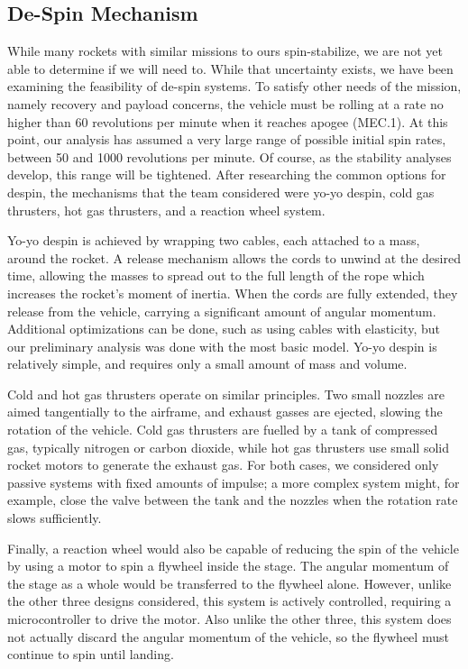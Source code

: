 \subsection{De-Spin Mechanism}
While many rockets with similar missions to ours spin-stabilize, we are not yet able to determine if we will need to. While that uncertainty exists, we have been examining the feasibility of de-spin systems. To satisfy other needs of the mission, namely recovery and payload concerns, the vehicle must be rolling at a rate no higher than 60 revolutions per minute when it reaches apogee (MEC.1). At this point, our analysis has assumed a very large range of possible initial spin rates, between 50 and 1000 revolutions per minute. Of course, as the stability analyses develop, this range will be tightened. After researching the common options for despin, the mechanisms that the team considered were yo-yo despin, cold gas thrusters, hot gas thrusters, and a reaction wheel system.

Yo-yo despin is achieved by wrapping two cables, each attached to a mass, around the rocket. A release mechanism allows the cords to unwind at the desired time, allowing the masses to spread out to the full length of the rope which increases the rocket’s moment of inertia. When the cords are fully extended, they release from the vehicle, carrying a significant amount of angular momentum. Additional optimizations can be done, such as using cables with elasticity, but our preliminary analysis was done with the most basic model. Yo-yo despin is relatively simple, and requires only a small amount of mass and volume.

Cold and hot gas thrusters operate on similar principles. Two small nozzles are aimed tangentially to the airframe, and exhaust gasses are ejected, slowing the rotation of the vehicle. Cold gas thrusters are fuelled by a tank of compressed gas, typically nitrogen or carbon dioxide, while hot gas thrusters use small solid rocket motors to generate the exhaust gas. For both cases, we considered only passive systems with fixed amounts of impulse; a more complex system might, for example, close the valve between the tank and the nozzles when the rotation rate slows sufficiently.

Finally, a reaction wheel would also be capable of reducing the spin of the vehicle by using a motor to spin a flywheel inside the stage. The angular momentum of the stage as a whole would be transferred to the flywheel alone. However, unlike the other three designs considered, this system is actively controlled, requiring a microcontroller to drive the motor. Also unlike the other three, this system does not actually discard the angular momentum of the vehicle, so the flywheel must continue to spin until landing.

